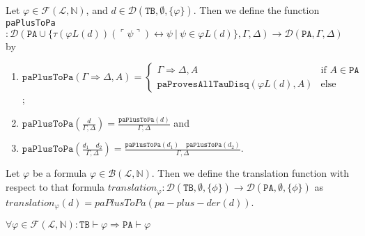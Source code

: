 \begin{definition}\label{def:paPlusToPa}
    \leanok
    Let $\varphi \in \mathcal{F}(\mathcal{L},\mathbb{N})$, and $d \in \mathcal{D}(\texttt{TB},\emptyset,\{\varphi\})$. Then we define the function \texttt{paPlusToPa}$: \mathcal{D}(\texttt{PA} \cup \{\tau(\varphi L(d))(\ulcorner \psi \urcorner) \leftrightarrow \psi ~|~ \psi \in \varphi L(d)\},\Gamma,\Delta) \to \mathcal{D}(\texttt{PA},\Gamma,\Delta)$ by
    \begin{enumerate}
    \item $\texttt{paPlusToPa}(\Gamma \Rightarrow \Delta, A) = \begin{cases}
        \Gamma \Rightarrow \Delta, A & \text{if } A \in \texttt{PA} \\
        \texttt{paProvesAllTauDisq}(\varphi L(d),A) & \text{else}
    \end{cases}$;
    \item $\texttt{paPlusToPa}(\frac{d}{\Gamma, \Delta}) = \frac{\texttt{paPlusToPa}(d)}{\Gamma, \Delta}$ and
    \item $\texttt{paPlusToPa}(\frac{d_1 \quad d_2}{\Gamma, \Delta}) = \frac{\texttt{paPlusToPa}(d_1) \quad \texttt{paPlusToPa}(d_2)}{\Gamma, \Delta}$.
    \end{enumerate}
\end{definition}

\begin{definition}[Translation]\label{def:Translation}
    \leanok
    Let $\varphi$ be a formula $\varphi \in \mathcal{B}(\mathcal{L},\mathbb{N})$. Then we define the translation function with respect to that formula $translation_{\varphi} : \mathcal{D}(\texttt{TB},\emptyset,\{\phi\}) \to \mathcal{D}(\texttt{PA},\emptyset,\{\phi\})$ as $translation_{\varphi}(d) = paPlusToPa(pa-plus-der(d))$.
\end{definition}

\begin{theorem}
    \leanok
    $\forall \varphi \in \mathcal{F}(\mathcal{L},\mathbb{N}) : \texttt{TB} \vdash \varphi \Rightarrow \texttt{PA} \vdash \varphi$
\end{theorem}


